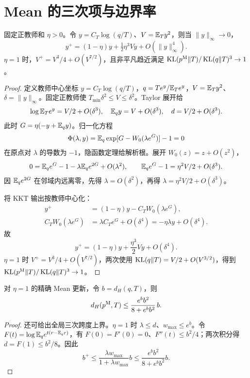 \section{Mean 的三次项与边界率}
\begin{theorem}
固定正教师和 $\eta>0$。令 $y=C_T\log(q/T)$、$V=\mathbb E_Ty^2$，则当 $\|y\|_\infty\to0$，
\begin{equation}
y^+=(1-\eta)y+\tfrac12\eta^3Vy+O(\|y\|_\infty^4).
\end{equation}
$\eta=1$ 时，$V^+=V^3/4+O(V^{7/2})$，且非平凡趋近满足
$\operatorname{KL}(p^{\rm M}\Vert T)/\operatorname{KL}(q\Vert T)^3\to1$。
\end{theorem}
\begin{proof}
定义教师中心坐标 $y=C_T\log(q/T)$，$q=Te^y/\mathbb E_Te^y$，$V=\mathbb E_Ty^2$、$\delta=\|y\|_\infty$。固定正教师使 $T_{\min}\delta^2\le V\le\delta^2$。Taylor 展开给
\begin{equation}
\log\mathbb E_Te^y=V/2+O(\delta^3),\quad
\mathbb E_qy=V+O(\delta^3),\quad d=V/2+O(\delta^3).
\end{equation}
此时 $G=\eta(-y+\mathbb E_qy)$。归一化方程
\begin{equation}
\Phi(\lambda,y)=\mathbb E_q\exp[G-W_0(\lambda e^G)]-1=0
\end{equation}
在原点对 $\lambda$ 的导数为 $-1$，隐函数定理给解析根。展开 $W_0(z)=z+O(z^2)$，
\begin{equation}
0=\mathbb E_qe^G-1-\lambda\mathbb E_qe^{2G}+O(\lambda^2),\qquad
\mathbb E_qe^G-1=\eta^2V/2+O(\delta^3).
\end{equation}
因 $\mathbb E_qe^{2G}$ 在邻域内远离零，先得 $\lambda=O(\delta^2)$，再得 $\lambda=\eta^2V/2+O(\delta^3)$。

将 KKT 输出按教师中心化：
\begin{align}
y^+&=(1-\eta)y-C_TW_0(\lambda e^G),\\
C_TW_0(\lambda e^G)&=\lambda C_Te^G+O(\delta^4)
=-\eta\lambda y+O(\delta^4).
\end{align}
故
\begin{equation}
y^+=(1-\eta)y+\frac{\eta^3}{2}Vy+O(\delta^4).
\label{eq:mean-cubic}
\end{equation}
$\eta=1$ 时 $V^+=V^3/4+O(V^{7/2})$，两次使用 $\operatorname{KL}(q\Vert T)=V/2+O(V^{3/2})$，得到 $\operatorname{KL}(p^{\rm M}\Vert T)/\operatorname{KL}(q\Vert T)^3\to1$。
\end{proof}

\begin{proposition}
对 $\eta=1$ 的精确 Mean 更新，令 $b=d_H(q,T)$，则
\begin{equation}
d_H(p^{\rm M},T)\le \frac{e^bb^2}{8+e^bb^2}\,b.
\end{equation}
\end{proposition}
\begin{proof}
还可给出全局三次跨度上界。$\eta=1$ 时 $\lambda\le d$、$w_{\max}\le e^b$。令 $F(t)=\log\mathbb E_qe^{t(r-\mathbb E_qr)}$，有 $F(0)=F'(0)=0$、$F''(t)\le b^2/4$；两次积分得 $d=F(1)\le b^2/8$。因此
\begin{equation}
b^+\le\frac{\lambda w_{\max}}{1+\lambda w_{\max}}b
\le\frac{e^bb^2}{8+e^bb^2}b.
\end{equation}
\end{proof}

